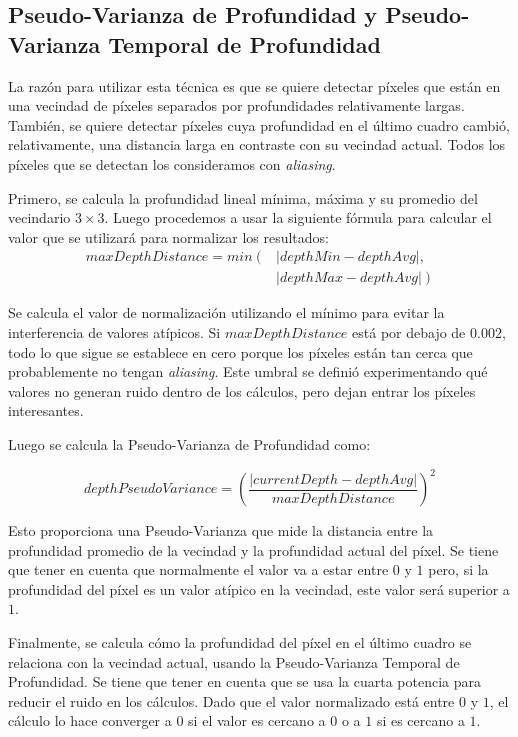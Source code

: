 \documentclass[pregrado]{tesis-usb} %
\begin{document}
\subsection{Pseudo-Varianza de Profundidad y Pseudo-Varianza Temporal de Profundidad}
La razón para utilizar esta técnica es que se quiere detectar píxeles que están en una vecindad de píxeles separados por profundidades relativamente largas. También, se quiere detectar píxeles cuya profundidad en el último cuadro cambió, relativamente, una distancia larga en contraste con su vecindad actual. Todos los píxeles que se detectan los consideramos con \textit{aliasing}.

Primero, se calcula la profundidad lineal mínima, máxima y su promedio del vecindario $3\times 3$. Luego procedemos a usar la siguiente fórmula para calcular el valor que se utilizará para normalizar los resultados: 
\begin{equation} \label{eq:maxdepthdistance}
\begin{split} 
	maxDepthDistance = min \left( \right. & \left| depthMin-depthAvg \right|  ,   \\ 
	 &  \left.\left| depthMax-depthAvg\right| \right) 
\end{split} 
\end{equation}

Se calcula el valor de normalización utilizando el mínimo para evitar la interferencia de valores atípicos. Si $maxDepthDistance$ está por debajo de $0.002$, todo lo que sigue se establece en cero porque los píxeles están tan cerca que probablemente no tengan \textit{aliasing}. Este umbral se definió experimentando qué valores no generan ruido dentro de los cálculos, pero dejan entrar los píxeles interesantes.

Luego se calcula la Pseudo-Varianza de Profundidad como:

\begin{equation} \label{eq:depthpseudovariance}
	depthPseudoVariance = \left( \frac{\left|currentDepth-depthAvg\right|}{maxDepthDistance}\right)^2
\end{equation}

Esto proporciona una Pseudo-Varianza que mide la distancia entre la profundidad promedio de la vecindad y la profundidad actual del píxel. Se tiene que tener en cuenta que normalmente el valor va a estar entre $0$ y $1$ pero, si la profundidad del píxel es un valor atípico en la vecindad, este valor será superior a $1$.

Finalmente, se calcula cómo la profundidad del píxel en el último cuadro se relaciona con la vecindad actual, usando la Pseudo-Varianza Temporal de Profundidad. Se tiene que tener en cuenta que se usa la cuarta potencia para reducir el ruido en los cálculos. Dado que el valor normalizado está entre $0$ y $1$, el cálculo lo hace converger a $0$ si el valor es cercano a $0$ o a $1$ si es cercano a $1$.
\end{document}
